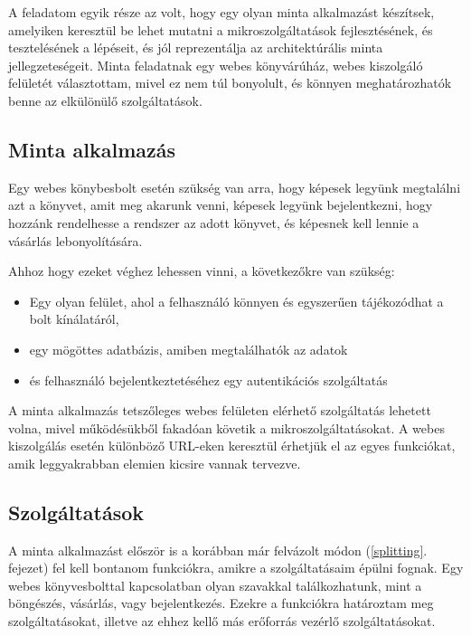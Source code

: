 \documentclass[11pt,magyar,a4paper,twoside,]{report}
\providecommand{\tightlist}{%
  \setlength{\itemsep}{0pt}\setlength{\parskip}{0pt}}
\begin{document}
A feladatom egyik része az volt, hogy egy olyan minta alkalmazást
készítsek, amelyiken keresztül be lehet mutatni a mikroszolgáltatások
fejlesztésének, és tesztelésének a lépéseit, és jól reprezentálja az
architektúrális minta jellegzeteségeit. Minta feladatnak egy webes
könyvárúház, webes kiszolgáló felületét választottam, mivel ez nem túl
bonyolult, és könnyen meghatározhatók benne az elkülönülő
szolgáltatások.

\subsection{Minta alkalmazás}\label{minta-alkalmazuxe1s}

Egy webes könybesbolt esetén szükség van arra, hogy képesek legyünk
megtalálni azt a könyvet, amit meg akarunk venni, képesek legyünk
bejelentkezni, hogy hozzánk rendelhesse a rendszer az adott könyvet, és
képesnek kell lennie a vásárlás lebonyolítására.

Ahhoz hogy ezeket véghez lehessen vinni, a következőkre van szükség:

\begin{itemize}
\tightlist
\item
  Egy olyan felület, ahol a felhasználó könnyen és egyszerűen
  tájékozódhat a bolt kínálatáról,
\item
  egy mögöttes adatbázis, amiben megtalálhatók az adatok
\item
  és felhasználó bejelentkeztetéséhez egy autentikációs szolgáltatás
\end{itemize}

A minta alkalmazás tetszőleges webes felületen elérhető szolgáltatás
lehetett volna, mivel működésükből fakadóan követik a
mikroszolgáltatásokat. A webes kiszolgálás esetén különböző URL-eken
keresztül érhetjük el az egyes funkciókat, amik leggyakrabban elemien
kicsire vannak tervezve.

\subsection{Szolgáltatások}\label{szolguxe1ltatuxe1sok}

A minta alkalmazást először is a korábban már felvázolt módon
(\ref{splitting}. fejezet) fel kell bontanom funkciókra, amikre a
szolgáltatásaim épülni fognak. Egy webes könyvesbolttal kapcsolatban
olyan szavakkal találkozhatunk, mint a böngészés, vásárlás, vagy
bejelentkezés. Ezekre a funkciókra határoztam meg szolgáltatásokat,
illetve az ehhez kellő más erőforrás vezérlő szolgáltatásokat.
\end{document}
